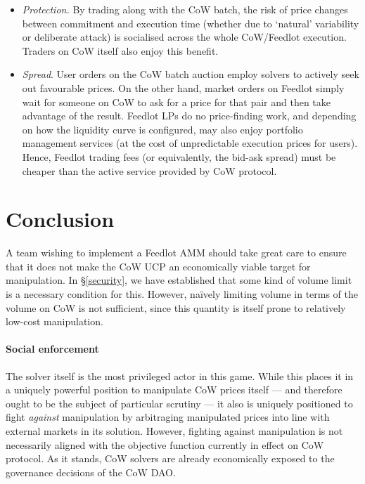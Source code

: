 \documentclass[a4paper,10pt]{article}
\theoremstyle{remark}
\begin{document}
\begin{itemize}
  \item 
    \emph{Protection.} By trading along with the CoW batch, the risk of price changes between commitment and execution time (whether due to `natural' variability or deliberate attack) is socialised across the whole CoW/Feedlot execution.
    Traders on CoW itself also enjoy this benefit.
    
  \item
    \emph{Spread}. User orders on the CoW batch auction employ solvers to actively seek out favourable prices. On the other hand, market orders on Feedlot simply wait for someone on CoW to ask for a price for that pair and then take advantage of the result.
    Feedlot LPs do no price-finding work, and depending on how the liquidity curve is configured, may also enjoy portfolio management services (at the cost of unpredictable execution prices for users).
    Hence, Feedlot trading fees (or equivalently, the bid-ask spread) must be cheaper than the active service provided by CoW protocol.

\end{itemize}

\section{Conclusion}

A team wishing to implement a Feedlot AMM should take great care to ensure that it does not make the CoW UCP an economically viable target for manipulation.
%
In \S\ref{security}, we have established that some kind of volume limit is a necessary condition for this.
%
However, na\"ively limiting volume in terms of the volume on CoW is not sufficient, since this quantity is itself prone to relatively low-cost manipulation.

\paragraph{Social enforcement}
The solver itself is the most privileged actor in this game. 
%
While this places it in a uniquely powerful position to manipulate CoW prices itself --- and therefore ought to be the subject of particular scrutiny --- it also is uniquely positioned to fight \emph{against} manipulation by arbitraging manipulated prices into line with external markets in its solution.
%
However, fighting against manipulation is not necessarily aligned with the objective function currently in effect on CoW protocol.
%
As it stands, CoW solvers are already economically exposed to the governance decisions of the CoW DAO.
\end{document}
